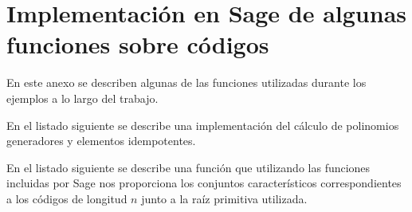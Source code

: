 \chapter{Implementación en Sage de algunas funciones sobre códigos}
\label{annex:sage-gen-idemp}

En este anexo se describen algunas de las funciones utilizadas durante los ejemplos a lo largo del trabajo.

En el listado siguiente se describe una implementación del cálculo de polinomios generadores y elementos idempotentes.



En el listado siguiente se describe una función que utilizando las funciones incluidas por Sage nos proporciona los conjuntos característicos correspondientes a los códigos de longitud \(n\) junto a la raíz primitiva utilizada.

